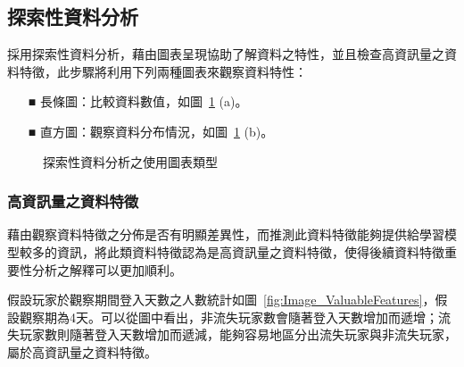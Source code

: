 \subsection{探索性資料分析}
採用探索性資料分析，藉由圖表呈現協助了解資料之特性，並且檢查高資訊量之資料特徵，此步驟將利用下列兩種圖表來觀察資料特性：

\begin{itemize}
  \item [■] 長條圖：比較資料數值，如圖~\ref{fig:Image_EDADiagrams} (a)。
  \item [■] 直方圖：觀察資料分布情況，如圖~\ref{fig:Image_EDADiagrams} (b)。
\end{itemize}

\begin{figure}[!htb]
  \centering
  \caption[探索性資料分析之使用圖表類型]{探索性資料分析之使用圖表類型}
  \label{fig:Image_EDADiagrams}
\end{figure}

\subsubsection{高資訊量之資料特徵}
\label{subsubsec:ValuableFeatures}

藉由觀察資料特徵之分佈是否有明顯差異性，而推測此資料特徵能夠提供給學習模型較多的資訊，將此類資料特徵認為是高資訊量之資料特徵，使得後續資料特徵重要性分析之解釋可以更加順利。

假設玩家於觀察期間登入天數之人數統計如圖~\ref{fig:Image_ValuableFeatures}，假設觀察期為4天。可以從圖中看出，非流失玩家數會隨著登入天數增加而遞增；流失玩家數則隨著登入天數增加而遞減，能夠容易地區分出流失玩家與非流失玩家，屬於高資訊量之資料特徵。

